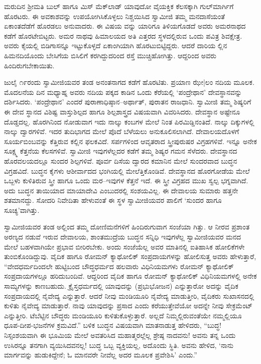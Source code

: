 ಮರುದಿನ ಶ್ರೀಮತಿ ಬುಲ್ ಹಾಗೂ ಮಿಸ್ ಮೆಕ್​ಲಾಡ್ ಯಾವುದೋ ವೈಯಕ್ತಿಕ ಕೆಲಸಕ್ಕಾಗಿ ಗುಲ್​ಮಾರ್ಗಿಗೆ ಹೊರಟರು. ಈ ಅವಕಾಶವನ್ನು ಉಪಯೋಗಿಸಿಕೊಳ್ಳಲು ನಿಶ್ಚಯಿಸಿದ ಸ್ವಾಮೀಜಿ ತಮ್ಮ ಮನದಾಸೆಯಂತೆ ಏಕಾಂತದೆಡೆಗೆ ಹೊರಡಲು ಅನುವಾದರು. ಈ ವಿಷಯ ವನ್ನು ಯಾರಿಗೂ ತಿಳಿಯಗೊಡದೆ ಅವರು ಅಮರನಾಥದ ಕಡೆಗೆ ಹೊರಟೇಬಿಟ್ಟರು. ಅಮರ ನಾಥವು ಹಿಮಾಲಯದ ಅತಿ ಎತ್ತರದ ಸ್ಥಳದಲ್ಲಿರುವ ಒಂದು ಪವಿತ್ರ ಶಿವಕ್ಷೇತ್ರ. ಅವರು ಕೈಯಲ್ಲಿ ಬಿಡಿಗಾಸನ್ನೂ ಇಟ್ಟುಕೊಳ್ಳದೆ ಏಕಾಂಗಿಯಾಗಿ ಹೊರಟುಬಿಟ್ಟಿದ್ದರು. ಆದರೆ ದಾರಿಯ ಲ್ಲಿನ ಹಿಮನದಿಯೊಂದು ಬೇಸಿಗೆಯ ಬಿಸಿಲಿಗೆ ಕರಗಿದ್ದುದರಿಂದ ರಸ್ತೆ ಮುಚ್ಚಿಹೋಗಿತ್ತು. ಆದ್ದರಿಂದ ಅವರು ಹಿಂದಿರುಗಬೇಕಾಯಿತು.

ಜುಲೈ ೧೯ರಂದು ಸ್ವಾಮೀಜಿಯವರ ತಂಡ ಅನಂತನಾಗದ ಕಡೆಗೆ ಹೊರಟಿತು. ಪ್ರಯಾಣ ಝೇ|ಲಂ ನದಿಯ ಮೂಲಕ. ಮೊದಲನೆಯ ದಿನ ಮಧ್ಯಾಹ್ನ ಅವರು ನದಿಯ ಪಕ್ಕದ ಕಾಡಿನ ಒಂದು ಕೆರೆಯಲ್ಲಿ ‘ಪಂದ್ರೇಥಾನ’ ದೇವಸ್ಥಾನವನ್ನು ದರ್ಶಿಸಿದರು. ‘ಪಂದ್ರೇಥಾನ’ ಎಂದರೆ ಪುರಾಣಾಧಿಷ್ಠಾನ–ಅರ್ಥಾತ್, ಪುರಾತನ ರಾಜಧಾನಿ. ಸ್ವಾಮೀಜಿ ತಮ್ಮ ಶಿಷ್ಯರಿಗೆ ಈ ದೇವ ಸ್ಥಾನದ ವಿಶಿಷ್ಟ ವಾಸ್ತುಶಿಲ್ಪದ ಹಾಗೂ ಶಿಲ್ಪಶಾಸ್ತ್ರದ ವಿಷಯವಾಗಿ ವಿವರಿಸಿದರು. ದೇವಸ್ಥಾನ ಅಷ್ಟೇನೂ ದೊಡ್ಡದಲ್ಲ. ಹೊರಗಿನಿಂದ ನೋಡುವಾಗ ಇದು ನಾಲ್ಕು ಕಂಬಗಳ ಮೇಲೆ ನಿಂತ ಪಿರಮಿಡ್ಡಿನಂತಿದೆ. ನಾಲ್ಕು ದಿಕ್ಕುಗಳಲ್ಲಿ ನಾಲ್ಕು ದ್ವಾರಗಳಿವೆ. ಇದರ ತುದಿಭಾಗದ ಮೇಲೆ ಪೊದೆ ಬೆಳೆಯಲು ಅನುಕೂಲಿಸಲಾಗಿದೆ. ದೇವಾಲಯದೊಳಗೆ ಸೂರ್ಯಬಿಂಬವನ್ನು ಕೆತ್ತಿರುವ ಕಲ್ಲಿನ ಫಲಕವಿದೆ. ಸರ್ಪಗಳಿಂದ ಆವೃತರಾದ ಸ್ತ್ರೀಪುರುಷರ ವಿಗ್ರಹಗಳಿವೆ. ಇನ್ನೂ ಅನೇಕ ಸೂಕ್ಷ್ಮ ಕೆತ್ತನೆಯ ಕೆಲಸಗಳಿವೆ. ಸ್ವಾಮೀಜಿ ಇವುಗಳೆಲ್ಲದರ ಕಡೆಗೆ ತಮ್ಮ ಶಿಷ್ಯರ ಗಮನ ಸೆಳೆದರು. ದೇವಸ್ಥಾನದ ಹೊರವಲಯದಲ್ಲೂ ಸುಂದರ ಶಿಲ್ಪಗಳಿವೆ. ಪೂರ್ವ ದಿಸೆಯ ದ್ವಾರದ ಕಮಾನಿನ ಮೇಲೆ ಸುಂದರವಾದ ಬುದ್ಧನ ವಿಗ್ರಹವಿದೆ. ಬುದ್ಧನ ಕೈಗಳು ಆಶೀರ್ವಾದದ ಭಂಗಿಯಲ್ಲಿ ಮೇಲೆತ್ತಿಕೊಂಡಿವೆ. ದೇವಸ್ಥಾನದ ಹೊರಗೋಡೆಯ ಮೇಲೆ ಒಬ್ಬಳು ಕುಳಿತಿರುವ ಸ್ತ್ರೀ ಹಾಗೂ ಒಂದು ಮರ–ಇವುಗಳ ಕೆತ್ತನೆ ಇದೆ. ಈ ಸ್ತ್ರೀ ವಿಗ್ರಹದ ಮುಖ ಸ್ವಲ್ಪ ಭಗ್ನವಾಗಿದೆ. ಅದು ಬುದ್ಧನ ತಾಯಿಯಾದ ಮಾಯಾದೇವಿ ಎಂಬುದರಲ್ಲಿ ಸಂಶಯವಿಲ್ಲ. ಈ ದೇವಾಲಯ ಸುಮಾರು ಹತ್ತನೇ ಶತಮಾನದ್ದು. ಸೋದರಿ ನಿವೇದಿತಾ ಹೇಳುವಂತೆ ಈ ಸ್ಥಳ ಸ್ವಾಮೀಜಿಯವರ ಪಾಲಿಗೆ ‘ಸುಂದರ ಹಾಗೂ ಸೂಚ್ಯ’ವಾಗಿತ್ತು.

ಸ್ವಾಮೀಜಿಯವರ ತಂಡ ಅಲ್ಲಿಂದ ತಮ್ಮ ದೋಣಿಮನೆಗಳಿಗೆ ಹಿಂದಿರುಗುವಾಗ ಸಂಜೆಯಾ ಗಿತ್ತು. ಆ ನೀರವ ಪ್ರಶಾಂತ ಅರಣ್ಯದ ನಡುವೆ ಇರುವ ದೇವಾಲಯ, ಶಾಂತಮುದ್ರೆಯ ಬುದ್ಧನ ಸನ್ನಿಧಿ ಇವುಗಳೆಲ್ಲ ಸ್ವಾಮೀಜಿಯವರ ಮನದ ಮೇಲೆ ಬಹಳವಾಗಿಯೇ ಪ್ರಭಾವ ಬೀರಿರಬೇಕು. ಅಂದು ಸಂಜೆಯೆಲ್ಲ ಅವರ ಮಾತಿನಲ್ಲಿ ಐತಿಹಾಸಿಕ ಹೋಲಿಕೆಗಳೇ ತುಂಬಿಕೊಂಡಿದ್ದುವು. ವೈದಿಕ ಹಾಗೂ ರೋಮನ್ ಕ್ಯಾಥೋಲಿಕ್ ಸಂಪ್ರದಾಯಗಳನ್ನು ಹೋಲಿಸುತ್ತ ಅವರು ಹೇಳುತ್ತಾರೆ, “ವೇದಧರ್ಮದಿಂದಲೇ ಹುಟ್ಟಿಬಂದ ಬೌದ್ಧಧರ್ಮದ ಹಲವಾರು ವಿಧಿನಿಯಮಗಳು ರೋಮನ್ ಕ್ಯಾಥೋಲಿಕ್ ಸಂಪ್ರದಾಯಗಳಲ್ಲೂ ಹರಿದುಬಂದಿವೆ. ಆದ್ದರಿಂದ ವೈದಿಕ ಹಾಗೂ ರೋಮನ್ ಕ್ಯಾಥೋಲಿಕ್ ವಿಧಿನಿಯಮಗಳಲ್ಲಿ ಅನೇಕ ಸಾಮ್ಯಗಳನ್ನು ಕಾಣಬಹುದು. ಕ್ರೈಸ್ತಧರ್ಮದಲ್ಲಿ ಯಾವುದನ್ನು  (ಪ್ರಭುಭೋಜನ) ಎನ್ನುತ್ತಾರೋ ಅದನ್ನು ವೈದಿಕ ಸಂಪ್ರದಾಯದಲ್ಲಿ ನೈವೇದ್ಯ ಎನ್ನುತ್ತಾರೆ. ಆದರೆ ನೀವು ಮಂಡಿಯೂರಿ ನೈವೇದ್ಯ ಮಾಡುತ್ತೀರಿ, ವೈದಿಕರು ಸುಖಾಸನದಲ್ಲಿ ಕುಳಿತು ನೈವೇದ್ಯ ಮಾಡುತ್ತಾರೆ. ನಾವು ಯಾವುದನ್ನು ಪ್ರಸಾದ ಎಂದು ಕರೆಯುತ್ತೇವೆಯೋ ಅದನ್ನೇ ನೀವು ಸೇಕ್ರಮೆಂಟ್  ಎನ್ನುತ್ತೀರಿ. ಟೆಬೆಟ್ಟಿನ ಬೌದ್ಧರು ಮಂಡಿಯೂರಿ ಕುಳಿತುಕೊಳ್ಳುತ್ತಾರೆ. ಅಲ್ಲದೆ ನಿಮ್ಮಲ್ಲಿರುವಂತೆಯೇ ನಮ್ಮಲ್ಲಿಯೂ ಧೂಪ-ದೀಪ-ಭಜನೆಗಳ ಕ್ರಮವಿದೆ.” ಬಳಿಕ ಬುದ್ಧನ ವಿಷಯವಾಗಿ ಮಾತನಾಡುತ್ತ ಹೇಳಿದರು, “ಬುದ್ಧ! ನಿಸ್ಸಂಶಯವಾಗಿ ಈ ಭೂಮಿಯ ಮೇಲೆ ಅವತರಿಸಿದ ಮಹಾತ್ಮರಲ್ಲೆಲ್ಲ ಶ್ರೇಷ್ಠ ನಾದವನು! ಅವನು ತನ್ನ ಒಂದು ಉಸಿರನ್ನೂ ತನಗಾಗಿ ವ್ಯಯಿಸಿದವನಲ್ಲ! ಬುದ್ಧ ಒಬ್ಬ ವ್ಯಕ್ತಿಯಲ್ಲ, ಅದೊಂದು ಸ್ಥಿತಿ. ಅವನು ಹೇಳಿದ, ‘ನಾನು ಮಾರ್ಗವನ್ನು ಹುಡುಕಿದ್ದೇನೆ; ಓ ಮಾನವರೇ ನೀವೆಲ್ಲ ಅದರ ಮೂಲಕ ಪ್ರವೇಶಿಸಿ’ ಎಂದು.”

